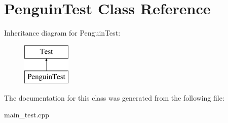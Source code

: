 \hypertarget{class_penguin_test}{}\section{Penguin\+Test Class Reference}
\label{class_penguin_test}
Inheritance diagram for Penguin\+Test\+:\begin{figure}[H]
\begin{center}
\leavevmode
\includegraphics[height=2.000000cm]{class_penguin_test}
\end{center}
\end{figure}


The documentation for this class was generated from the following file\+:\begin{DoxyCompactItemize}
\item 
main\+\_\+test.\+cpp\end{DoxyCompactItemize}
